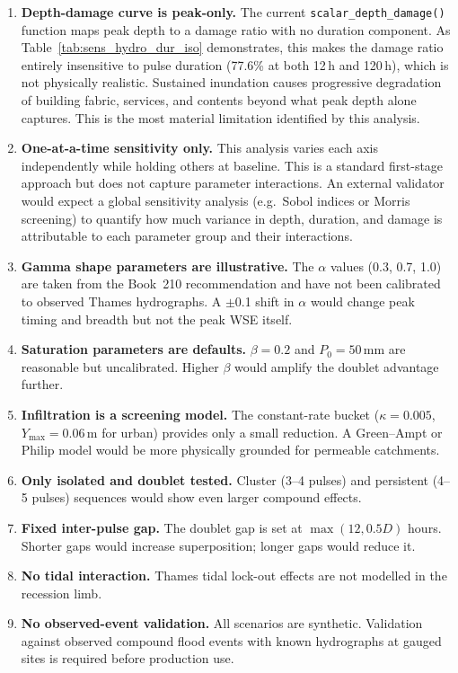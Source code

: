 \documentclass[11pt,a4paper]{article}
\begin{document}
\begin{enumerate}[nosep]
    \item \textbf{Depth-damage curve is peak-only.}  The current
          \texttt{scalar\_depth\_damage()} function maps peak depth to a damage
          ratio with no duration component.  As Table~\ref{tab:sens_hydro_dur_iso}
          demonstrates, this makes the damage ratio entirely insensitive to pulse
          duration (77.6\% at both 12\,h and 120\,h), which is not physically
          realistic.  Sustained inundation causes progressive degradation of
          building fabric, services, and contents beyond what peak depth alone
          captures.  This is the most material limitation identified by this
          analysis.
    \item \textbf{One-at-a-time sensitivity only.}  This analysis varies each axis
          independently while holding others at baseline.  This is a standard
          first-stage approach but does not capture parameter interactions.  An
          external validator would expect a global sensitivity analysis (e.g.\
          Sobol indices or Morris screening) to quantify how much variance in
          depth, duration, and damage is attributable to each parameter group and
          their interactions.
    \item \textbf{Gamma shape parameters are illustrative.}  The $\alpha$ values
          (0.3, 0.7, 1.0) are taken from the Book~210 recommendation and have not
          been calibrated to observed Thames hydrographs.  A $\pm$0.1 shift in
          $\alpha$ would change peak timing and breadth but not the peak WSE itself.
    \item \textbf{Saturation parameters are defaults.}  $\beta = 0.2$ and
          $P_0 = 50$\,mm are reasonable but uncalibrated.  Higher $\beta$ would
          amplify the doublet advantage further.
    \item \textbf{Infiltration is a screening model.}  The constant-rate bucket
          ($\kappa = 0.005$, $Y_{\max} = 0.06$\,m for urban) provides only a small
          reduction.  A Green--Ampt or Philip model would be more physically
          grounded for permeable catchments.
    \item \textbf{Only isolated and doublet tested.}  Cluster (3--4 pulses) and
          persistent (4--5 pulses) sequences would show even larger compound
          effects.
    \item \textbf{Fixed inter-pulse gap.}  The doublet gap is set at
          $\max(12, 0.5D)$ hours.  Shorter gaps would increase superposition;
          longer gaps would reduce it.
    \item \textbf{No tidal interaction.}  Thames tidal lock-out effects are not
          modelled in the recession limb.
    \item \textbf{No observed-event validation.}  All scenarios are synthetic.
          Validation against observed compound flood events with known hydrographs
          at gauged sites is required before production use.
\end{enumerate}
\end{document}
